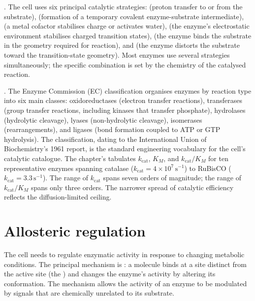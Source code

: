 . The cell uses six principal
catalytic strategies:  (proton transfer
to or from the substrate),  (formation of
a temporary covalent enzyme-substrate intermediate),  (a metal cofactor stabilises charge or activates water),
 (the enzyme's electrostatic
environment stabilises charged transition states),  (the enzyme binds the substrate in the geometry
required for reaction), and  (the enzyme
distorts the substrate toward the transition-state geometry). Most
enzymes use several strategies simultaneously; the specific
combination is set by the chemistry of the catalysed reaction.

. The Enzyme Commission (EC)
classification organises enzymes by reaction type into six main
classes: oxidoreductases (electron transfer reactions),
transferases (group transfer reactions, including kinases that
transfer phosphate), hydrolases (hydrolytic cleavage), lyases
(non-hydrolytic cleavage), isomerases (rearrangements), and ligases
(bond formation coupled to ATP or GTP hydrolysis). The
classification, dating to the International Union of Biochemistry's
1961 report, is the standard engineering vocabulary for the cell's
catalytic catalogue. The chapter's 
tabulates $k_{\text{cat}}$, $K_M$, and $k_{\text{cat}}/K_M$ for
ten representative enzymes spanning catalase
($k_{\text{cat}} = 4 \times 10^7\,\text{s}^{-1}$) to RuBisCO
($k_{\text{cat}} = 3.3\,\text{s}^{-1}$). The range of $k_{\text{cat}}$
spans seven orders of magnitude; the range of $k_{\text{cat}}/K_M$
spans only three orders. The narrower spread of catalytic efficiency
reflects the diffusion-limited ceiling.

\section{Allosteric regulation}

The cell needs to regulate enzymatic activity in response to changing
metabolic conditions. The principal mechanism is
: a molecule binds at a site distinct
from the active site (the ) and changes the
enzyme's activity by altering its conformation. The mechanism allows
the activity of an enzyme to be modulated by signals that are
chemically unrelated to its substrate.

